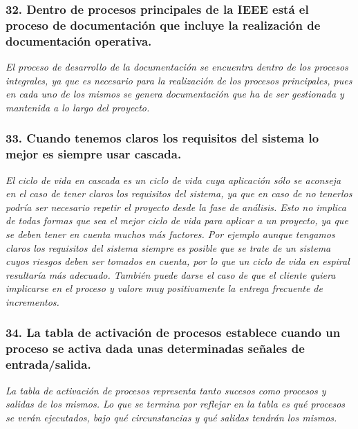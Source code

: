 \subsubsection*{32. Dentro de procesos principales de la IEEE está el proceso de documentación que incluye la realización de documentación operativa.} %
\textit{El proceso de desarrollo de la documentación se encuentra dentro de los procesos integrales, ya que es necesario para la realización de los procesos principales, pues en cada uno de los mismos se genera documentación que ha de ser gestionada y mantenida a lo largo del proyecto.}


\subsubsection*{33. Cuando tenemos claros los requisitos del sistema lo mejor es siempre usar cascada.} %
\textit{El ciclo de vida en cascada es un ciclo de vida cuya aplicación sólo se aconseja en el caso de tener claros los requisitos del sistema, ya que en caso de no tenerlos podría ser necesario repetir el proyecto desde la fase de análisis. Esto no implica de todas formas que sea el mejor ciclo de vida para aplicar a un proyecto, ya que se deben tener en cuenta muchos más factores. Por ejemplo aunque tengamos claros los requisitos del sistema siempre es posible que se trate de un sistema cuyos riesgos deben ser tomados en cuenta, por lo que un ciclo de vida en espiral resultaría más adecuado. También puede darse el caso de que el cliente quiera implicarse en el proceso y valore muy positivamente la entrega frecuente de incrementos.}

\subsubsection*{34. La tabla de activación de procesos establece cuando un proceso se activa dada unas determinadas señales de entrada/salida.} %
\textit{La tabla de activación de procesos representa tanto sucesos como procesos y salidas de los mismos. Lo que se termina por reflejar en la tabla es qué procesos se verán ejecutados, bajo qué circunstancias y qué salidas tendrán los mismos.}

